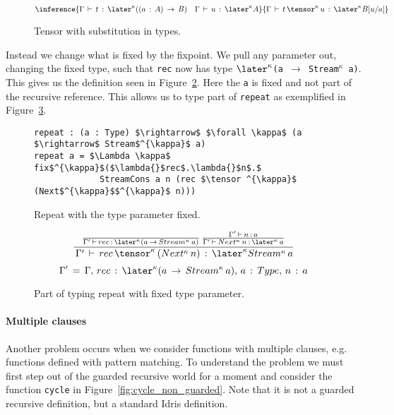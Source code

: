 \begin{figure}[h]
\[
\inference { \Gamma \, \vdash \, t\, :\, \later^{\kappa} ((a\, :\, A)\,
  \rightarrow \, B)\quad \Gamma \, \vdash \, u\, :\, \later^{\kappa} A }{
  \Gamma \, \vdash \, t\, \tensor ^{\kappa} \, u\, :\, \later^{\kappa} B[{ u
  }/{ a }] } 
\]
  \caption{Tensor with substitution in types.}
  \label{fig:tensor_with_subst}
\end{figure}

Instead we change what is fixed by the fixpoint. We pull any parameter out,
changing the fixed type, such that \texttt{rec} now has type \texttt{$\later
  ^{\kappa}$(a $\rightarrow$ Stream$^{\kappa}$ a)}. This gives us the definition seen in
Figure~\ref{fig:repeat_guarded_example_new}. Here the \texttt{a} is fixed and
not part of the recursive reference. This allows us to type part of
\texttt{repeat} as exemplified in Figure~\ref{fig:repeat_typing_new}.

\begin{figure}[h]
  \begin{lstlisting}[mathescape]
repeat : (a : Type) $\rightarrow$ $\forall \kappa$ (a $\rightarrow$ Stream$^{\kappa}$ a)
repeat a = $\Lambda \kappa$ fix$^{\kappa}$($\lambda{}$rec$.\lambda{}$n$.$ 
             StreamCons a n (rec $\tensor ^{\kappa}$ (Next$^{\kappa}$$^{\kappa}$ n)))
\end{lstlisting}
  \caption{Repeat with the type parameter fixed.}
  \label{fig:repeat_guarded_example_new}
\end{figure}

\begin{figure}[h]
\[
\frac { \frac {  }{ \Gamma '\, \vdash \, rec\, :\, \later ^{\kappa}(a\, \rightarrow
    \, Stream^{\kappa}\, a) } \, \frac { \Gamma '\, \vdash \, n\, :\, a }{ \Gamma '\,
    \vdash \, Next^{\kappa}\, n\, :\, \later ^{\kappa}\, a }  }{ \, \Gamma '\, \vdash \, rec\,
  \tensor ^{\kappa} \, (Next^{\kappa}\, n)\, :\, \later ^{\kappa}Stream^{\kappa}\, a }
\]
\[
 \Gamma '\, =\, \Gamma ,\, rec\, :\, \later ^{\kappa}(a\, \rightarrow \, Stream^{\kappa}\,
 a),\, a\, :\, Type,\, n\, :\, a
\]

  \caption{Part of typing repeat with fixed type parameter.}
  \label{fig:repeat_typing_new}
\end{figure}

\paragraph{Multiple clauses}
Another problem occurs when we consider functions with multiple clauses,
e.g. functions defined with pattern matching. To understand the problem we must
first step out of the guarded recursive world for a moment and consider the
function \texttt{cycle} in Figure~\ref{fig:cycle_non_guarded}. Note that it is
not a guarded recursive definition, but a standard Idris definition.

